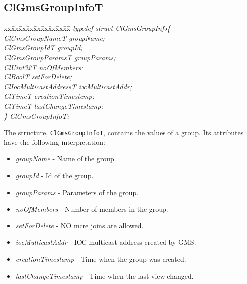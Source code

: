 \begin{flushleft}
\subsection{ClGmsGroupInfoT}
\begin{tabbing}
xx\=xx\=xx\=xx\=xx\=xx\=xx\=xx\=xx\=\kill
\textit{typedef struct ClGmsGroupInfo\{}\\
\>\>\>\>\textit{ClGmsGroupNameT     groupName;}\\
\>\>\>\>\textit{ClGmsGroupIdT       groupId;}\\
\>\>\>\>\textit{ClGmsGroupParamsT   groupParams;}\\
\>\>\>\>\textit{ClUint32T           noOfMembers;}\\
\>\>\>\>\textit{ClBoolT             setForDelete;}\\
\>\>\>\>\textit{ClIocMulticastAddressT iocMulticastAddr;}\\
\>\>\>\>\textit{ClTimeT                 creationTimestamp;}\\
\>\>\>\>\textit{ClTimeT                 lastChangeTimestamp;}\\
\textit{\} ClGmsGroupInfoT;}\end{tabbing} 
The structure, {\tt{ClGmsGroupInfoT}}, contains the values of a group. Its
attributes have the following interpretation:
\begin{itemize}
\item \textit{groupName} - Name of the group.
\item \textit{groupId} - Id of the group.
\item \textit{groupParams} - Parameters of the group.
\item \textit{noOfMembers} - Number of members in the group.
\item \textit{setForDelete} - NO more joins are allowed.
\item \textit{iocMulticastAddr} - IOC multicast address created by GMS.
\item \textit{creationTimestamp} - Time when the group was created.
\item \textit{lastChangeTimestamp} - Time when the last view changed.
\end{itemize}




\end{flushleft}
